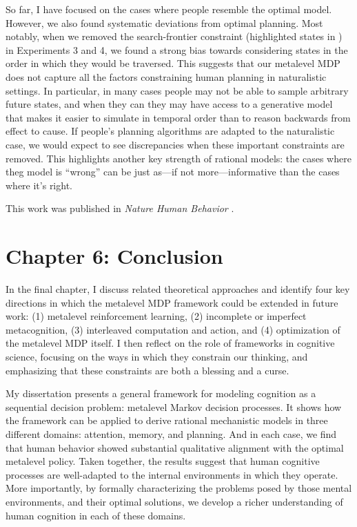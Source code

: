 \documentclass[dsingle]{memo}
\begin{document}
So far, I have focused on the cases where people resemble the optimal model. However, we also found systematic deviations from optimal planning. Most notably, when we removed the search-frontier constraint (highlighted states in ) in Experiments 3 and 4, we found a strong bias towards considering states in the order in which they would be traversed. This suggests that our metalevel MDP does not capture all the factors constraining human planning in naturalistic settings. In particular, in many cases people may not be able to sample arbitrary future states, and when they can they may have access to a generative model that makes it easier to simulate in temporal order than to reason backwards from effect to cause. If people's planning algorithms are adapted to the naturalistic case, we would expect to see discrepancies when these important constraints are removed. This highlights another key strength of rational models: the cases where theg model is ``wrong'' can be just as---if not more---informative than the cases where it's right.

This work was published in \emph{Nature Human Behavior} \citep{callaway2022rational}.


\section{Chapter 6: Conclusion}


In the final chapter, I discuss related theoretical approaches and identify four key directions in which the metalevel MDP framework could be extended in future work: (1) metalevel reinforcement learning, (2) incomplete or imperfect metacognition, (3) interleaved computation and action, and (4) optimization of the metalevel MDP itself. I then reflect on the role of frameworks in cognitive science, focusing on the ways in which they constrain our thinking, and emphasizing that these constraints are both a blessing and a curse.

My dissertation presents a general framework for modeling cognition as a sequential decision problem: metalevel Markov decision processes. It shows how the framework can be applied to derive rational mechanistic models in three different domains: attention, memory, and planning. And in each case, we find that human behavior showed substantial qualitative alignment with the optimal metalevel policy. Taken together, the results suggest that human cognitive processes are well-adapted to the internal environments in which they operate. More importantly, by formally characterizing the problems posed by those mental environments, and their optimal solutions, we develop a richer understanding of human cognition in each of these domains.


\clearpage


\end{document}
